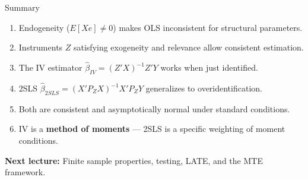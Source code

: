 \documentclass[aspectratio=169, handout]{beamer}
\numberwithin{equation}{section}
\begin{document}
\begin{frame}{Summary}
\begin{enumerate}
\item Endogeneity ($E[Xe]\neq 0$) makes OLS inconsistent for structural parameters.
\item Instruments $Z$ satisfying exogeneity and relevance allow consistent estimation.
\item The IV estimator $\hat{\beta}_{IV}=(Z'X)^{-1}Z'Y$ works when just identified.
\item 2SLS $\hat{\beta}_{2SLS}=(X'P_ZX)^{-1}X'P_ZY$ generalizes to overidentification.
\item Both are consistent and asymptotically normal under standard conditions.
\item IV is a \textbf{method of moments} --- 2SLS is a specific weighting of moment conditions.
\end{enumerate}
\vspace{0.2cm}
\begin{tcolorbox}[colback=blue!5, colframe=blue!50]
\textbf{Next lecture:} Finite sample properties, testing, LATE, and the MTE framework.
\end{tcolorbox}
\end{frame}
\end{document}
